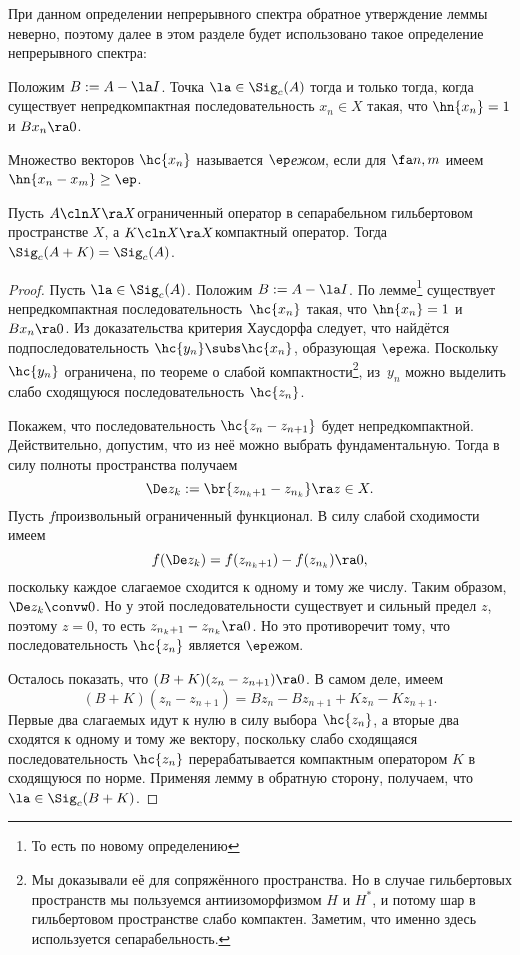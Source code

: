 \documentclass[a4paper]{article}
\begin{document}
При данном определении непрерывного спектра обратное утверждение леммы неверно, поэтому далее
в этом разделе будет использовано такое определение непрерывного спектра:

\begin{df}
Положим $B := A - \la I$. Точка $\la \in \Sig_c(A)$ тогда и только тогда, когда существует непредкомпактная
последовательность $x_n \in X$ такая, что $\hn{x_n} = 1$ и $B x_n \ra 0$.
\end{df}

\begin{df}
Множество векторов $\hc{x_n}$ называется \emph{$\ep$\д ежом}, если для $\fa n, m$ имеем
$\hn{x_n - x_m} \ge \ep$.
\end{df}

\begin{theorem}
Пусть $A\cln X\ra X$\т ограниченный оператор в сепарабельном гильбертовом пространстве $X$,
а $K\cln X \ra X$\т компактный оператор. Тогда $\Sig_c(A + K) = \Sig_c(A)$.
\end{theorem}
\begin{proof}
Пусть $\la \in \Sig_c(A)$. Положим $B := A - \la I$. По лемме\footnote{То есть по новому определению}
существует непредкомпактная последовательность~$\hc{x_n}$ такая, что $\hn{x_n} = 1$ и $B x_n \ra 0$.
Из доказательства критерия Хаусдорфа следует, что найдётся подпоследовательность $\hc{y_n} \subs \hc{x_n}$,
образующая $\ep$\д ежа. Поскольку $\hc{y_n}$ ограничена, по теореме о слабой компактности\footnote{Мы доказывали
её для сопряжённого пространства. Но в случае гильбертовых пространств мы пользуемся антиизоморфизмом $H$ и $H^*$,
и потому шар в гильбертовом пространстве слабо компактен. Заметим, что именно здесь используется сепарабельность.},
из~$y_n$ можно выделить слабо сходящуюся последовательность $\hc{z_n}$.

Покажем, что последовательность $\hc{z_n - z_{n+1}}$ будет непредкомпактной.
Действительно, допустим, что из неё можно выбрать фундаментальную.
Тогда в силу полноты пространства получаем
$$\De z_k := \br{z_{n_k+1} - z_{n_k}} \ra z \in X.$$
Пусть $f$\т произвольный ограниченный функционал. В силу слабой сходимости имеем
$$f(\De z_k) = f(z_{n_k + 1}) - f(z_{n_k}) \ra 0,$$
поскольку каждое слагаемое сходится к одному и тому же числу.
Таким образом, $\De z_k \convw 0$. Но у этой последовательности существует и сильный
предел $z$, поэтому $z = 0$, то есть $z_{n_k+1} - z_{n_k} \ra 0$.
Но это противоречит тому, что последовательность $\hc{z_n}$ является $\ep$\д ежом.

Осталось показать, что $(B + K)(z_n - z_{n+1}) \ra 0$. В самом деле, имеем
$$(B+K)(z_n - z_{n+1}) = B z_n - B z_{n+1} + K z_n - K z_{n+1}.$$
Первые два слагаемых идут к нулю в силу выбора $\hc{z_n}$, а вторые два
сходятся к одному и тому же вектору, поскольку слабо сходящаяся последовательность $\hc{z_n}$
перерабатывается компактным оператором $K$ в сходящуюся по норме.
Применяя лемму в обратную сторону, получаем, что $\la \in \Sig_c(B+K)$.
\end{proof}
\end{document}
